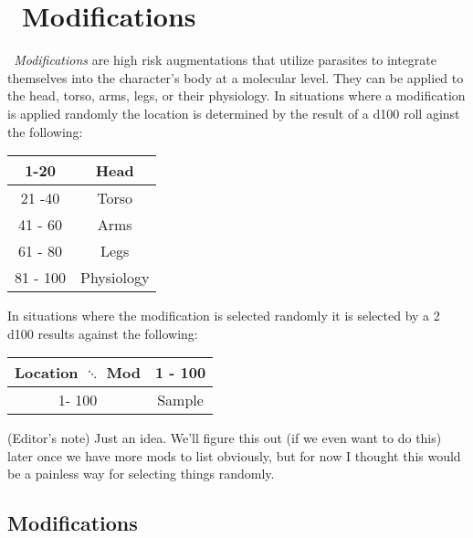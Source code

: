 \section{\biot\ Modifications}\label{sec:bio_mods}
\emph{\biot\ Modifications} are high risk augmentations that utilize parasites to integrate themselves into the character's body at a molecular level. They can be applied to the head, torso, arms, legs, or their physiology. In situations where a modification is applied randomly the location is determined by the result of a d100 roll aginst the following:
\begin{center}
\begin{tabular}{c | c}
1-20 & Head \\
\hline
21 -40 & Torso \\
\hline
41 - 60 & Arms \\
\hline
61 - 80 & Legs \\
\hline
81 - 100 & Physiology \\
\end{tabular}
\end{center}

In situations where the modification is selected randomly it is selected by a 2 d100 results against the following:
\begin{center}
\begin{tabular}{c | c}
Location $\ddots$ Mod & 1 - 100 \\
\hline
1- 100 & Sample
\end{tabular}
\end{center}
(Editor's note) Just an idea. We'll figure this out (if we even want to do this) later once we have more mods to list obviously, but for now I thought this would be a painless way for selecting things randomly.
\subsection*{Modifications}
\begin{multicols}{2}
\end{multicols}
\clearpage
